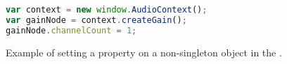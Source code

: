 \lstset{numbers=left,xleftmargin=2em,frame=single,framexleftmargin=1.5em}
\begin{figure}[h]
\begin{lstlisting}[language=javascript]
var context = new window.AudioContext();
var gainNode = context.createGain();
gainNode.channelCount = 1;
\end{lstlisting}
\caption{Example of setting a property on a non-singleton object in the \WAPI.}
\label{fig:non-singleton-property-js}
\end{figure}
